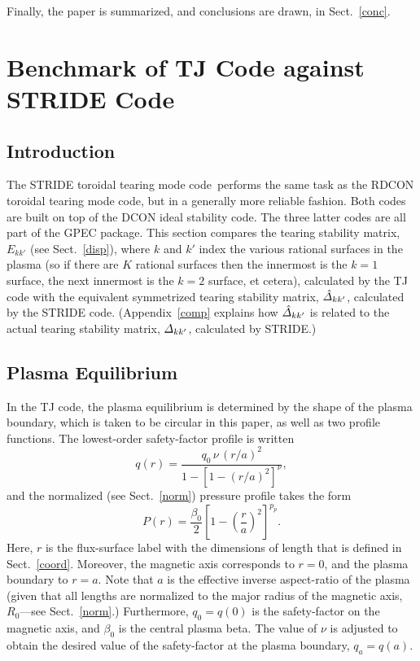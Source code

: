 \documentclass[12pt,prb,aps]{revtex4-1}
\begin{document}
Finally, the paper is summarized, and conclusions are drawn, in Sect.~\ref{conc}. 

\section{Benchmark of TJ Code against STRIDE Code}\label{benchmark}
\subsection{Introduction}
The STRIDE toroidal tearing mode code\,\cite{aglas1} performs the same task as the RDCON toroidal tearing mode code,\cite{aglas2} but in a generally more reliable fashion. Both codes are built on top of the
DCON ideal stability code.\cite{dcon} The three latter codes are all  part of the GPEC package.\cite{gpec} This section compares the tearing stability matrix, $E_{kk'}$ (see Sect.~\ref{disp}), where $k$ and $k'$ index the various rational surfaces in the
plasma (so if there are $K$ rational surfaces then the innermost is the $k=1$ surface, the next innermost is the $k=2$ surface, et cetera), calculated by the TJ code with the equivalent symmetrized tearing stability matrix, $\hat{\mit\Delta}_{kk'}$, calculated by the STRIDE code. (Appendix~\ref{comp} explains how
$\hat{\mit\Delta}_{kk'}$ is related to the actual tearing stability matrix, ${\mit\Delta}_{kk'}$, calculated by STRIDE.)

\subsection{Plasma Equilibrium}
In the TJ code, the plasma equilibrium is determined by the shape of the plasma boundary, which is taken to be circular in this paper, as well as two profile functions. 
The lowest-order safety-factor profile is written\,\cite{tj}
\begin{equation}
q(r) = \frac{q_0\,\nu\,(r/a)^2}{1-[1-(r/a)^2]^\nu},
\end{equation}
and the normalized (see Sect.~\ref{norm}) pressure profile takes the form
\begin{equation}
P(r) = \frac{\beta_0}{2}\left[1-\left(\frac{r}{a}\right)^2\right]^{p_p}.
\end{equation}
Here, $r$ is the flux-surface label with the dimensions of length that is defined in Sect.~\ref{coord}.  Moreover, the magnetic axis corresponds to $r=0$, and the plasma
boundary to $r=a$.  Note that $a$ is the effective inverse aspect-ratio of the plasma (given that all lengths are normalized to the major radius of the magnetic axis, $R_0$---see Sect.~\ref{norm}.)
Furthermore, $q_0=q(0)$ is the safety-factor on the magnetic axis, and  $\beta_0$ is the central plasma beta. 
The value of $\nu$ is adjusted to obtain the desired value of the safety-factor at the plasma boundary, $q_a=q(a)$. 
\end{document}
